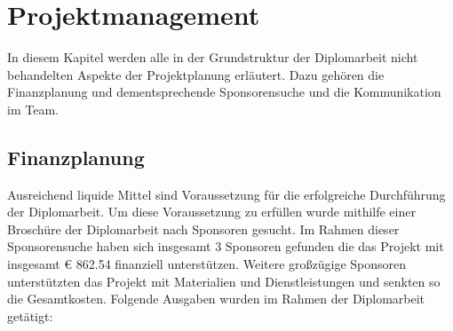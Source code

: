 \chapter{Projektmanagement}
In diesem Kapitel werden alle in der Grundstruktur der Diplomarbeit nicht behandelten Aspekte der Projektplanung erläutert. Dazu gehören die Finanzplanung und dementsprechende Sponsorensuche und die Kommunikation im Team. 
\section{Finanzplanung}
Ausreichend liquide Mittel sind Voraussetzung für die erfolgreiche Durchführung der Diplomarbeit. Um diese Voraussetzung zu erfüllen wurde mithilfe einer Broschüre der Diplomarbeit nach Sponsoren gesucht. Im Rahmen dieser Sponsorensuche haben sich insgesamt 3 Sponsoren gefunden die das Projekt mit insgesamt € 862.54 finanziell unterstützen. Weitere großzügige Sponsoren unterstützten das Projekt mit Materialien und Dienstleistungen und senkten so die Gesamtkosten. Folgende Ausgaben wurden im Rahmen der Diplomarbeit getätigt:

